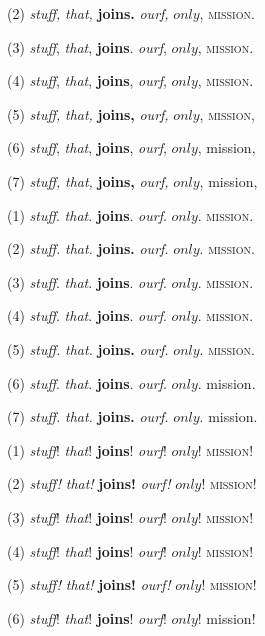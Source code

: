 \documentclass{amsart}
\begin{document}
(2) \textit{stuff,} \emph{that,} \textbf{joins.} \textit{ourf,} $only$, \textsc{mission.}

(3) \textit{stuff}\/, \emph{that}\/, \textbf{joins}\/. \textit{ourf}\/, $only$, \textsc{mission}\/.

(4) \textit{stuff}, \emph{that}, \textbf{joins}, \textit{ourf}, $only$, \textsc{mission}.

(5) \textit{stuff,} \emph{that,} \textbf{joins,} \textit{ourf,} $only$, \textsc{mission,}

(6) {\it stuff}, {\em that}, {\bf joins}, {\it ourf}, $only$, {\sc mission},

(7) {\it stuff,} {\em that,} {\bf joins,} {\it ourf,} $only$, {\sc mission,}

\vspace{12pt}

(1) \textit{stuff}. \emph{that}. \textbf{joins}. \textit{ourf}. $only$. \textsc{mission}.

(2) \textit{stuff.} \emph{that.} \textbf{joins.} \textit{ourf.} $only$. \textsc{mission.}

(3) \textit{stuff}\/. \emph{that}\/. \textbf{joins}\/. \textit{ourf}\/. $only$. \textsc{mission}\/.

(4) \textit{stuff}. \emph{that}. \textbf{joins}. \textit{ourf}. $only$. \textsc{mission}.

(5) \textit{stuff.} \emph{that.} \textbf{joins.} \textit{ourf.} $only$. \textsc{mission.}

(6) {\it stuff}. {\em that}. {\bf joins}. {\it ourf}. $only$. {\sc mission}.

(7) {\it stuff.} {\em that.} {\bf joins.} {\it ourf.} $only$. {\sc mission.}

\vspace{12pt}

(1) \textit{stuff}! \emph{that}! \textbf{joins}! \textit{ourf}! $only$! \textsc{mission}!

(2) \textit{stuff!} \emph{that!} \textbf{joins!} \textit{ourf!} $only$! \textsc{mission!}

(3) \textit{stuff}\/! \emph{that}\/! \textbf{joins}\/! \textit{ourf}\/! $only$! \textsc{mission}\/!

(4) \textit{stuff}! \emph{that}! \textbf{joins}! \textit{ourf}! $only$! \textsc{mission}!

(5) \textit{stuff!} \emph{that!} \textbf{joins!} \textit{ourf!} $only$! \textsc{mission!}

(6) {\it stuff}! {\em that}! {\bf joins}! {\it ourf}! $only$! {\sc mission}!
\end{document}
